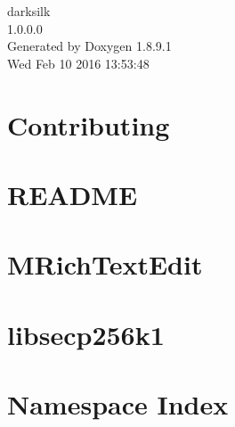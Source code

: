 \documentclass[twoside]{book}
\newcommand{\+}{\discretionary{\mbox{\scriptsize$\hookleftarrow$}}{}{}}
\newcommand{\clearemptydoublepage}{%
  \newpage{\pagestyle{empty}\cleardoublepage}%
}
\begin{document}
\hypersetup{pageanchor=false,
             bookmarks=true,
             bookmarksnumbered=true,
             pdfencoding=unicode
            }
\begin{titlepage}
\vspace*{7cm}
\begin{center}%
{\Large darksilk \\[1ex]\large 1.\+0.\+0.\+0 }\\
\vspace*{1cm}
{\large Generated by Doxygen 1.8.9.1}\\
\vspace*{0.5cm}
{\small Wed Feb 10 2016 13:53:48}\\
\end{center}
\end{titlepage}
\clearemptydoublepage
\tableofcontents
\clearemptydoublepage
{}
\hypersetup{pageanchor=true}

\chapter{Contributing}
\label{md__home_dev_ds-160209_src_leveldb__c_o_n_t_r_i_b_u_t_i_n_g}
\hypertarget{md__home_dev_ds-160209_src_leveldb__c_o_n_t_r_i_b_u_t_i_n_g}{}

\chapter{R\+E\+A\+D\+M\+E}
\label{md__home_dev_ds-160209_src_leveldb__r_e_a_d_m_e}
\hypertarget{md__home_dev_ds-160209_src_leveldb__r_e_a_d_m_e}{}

\chapter{M\+Rich\+Text\+Edit}
\label{md__home_dev_ds-160209_src_qt_plugins_mrichtexteditor__r_e_a_d_m_e}
\hypertarget{md__home_dev_ds-160209_src_qt_plugins_mrichtexteditor__r_e_a_d_m_e}{}

\chapter{libsecp256k1}
\label{md__home_dev_ds-160209_src_secp256k1__r_e_a_d_m_e}
\hypertarget{md__home_dev_ds-160209_src_secp256k1__r_e_a_d_m_e}{}

\chapter{Namespace Index}

\end{document}
